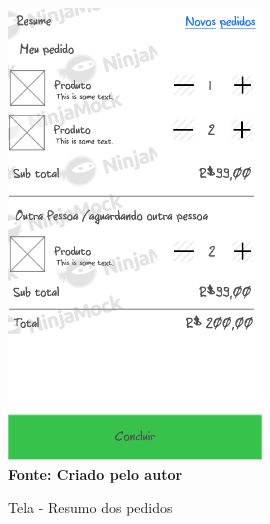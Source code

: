 \begin{figure}[ht]
	\centering	
	\caption[\hspace{0.1cm}]{Tela - Resumo dos pedidos}
	\vspace{-0.4cm}
	\includegraphics[width=0.6\textwidth]{figuras/c_resume.png}
	 \vspace{-0.2cm}
	\\\textbf{\footnotesize Fonte: Criado pelo autor }
	\label{fig:w8}
\end{figure}
\vspace{-0.5cm}

